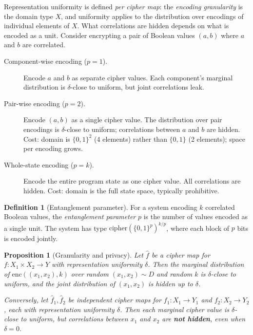 \documentclass[11pt]{article}
\theoremstyle{definition}
\newtheorem{definition}{Definition}[section]
\theoremstyle{plain}
\newtheorem{proposition}[theorem]{Proposition}
\theoremstyle{remark}
\newcommand{\fhat}{\hat{f}}
\newcommand{\enc}{\mathrm{enc}}
\begin{document}
Representation uniformity is defined \emph{per cipher map}: the
\emph{encoding granularity} is the domain type $X$, and uniformity applies
to the distribution over encodings of individual elements of $X$.  What
correlations are hidden depends on what is encoded as a unit.  Consider
encrypting a pair of Boolean values $(a, b)$ where $a$ and $b$ are
correlated.

\begin{description}
\item[Component-wise encoding ($p=1$).]
Encode $a$ and $b$ as separate cipher values.  Each component's marginal
distribution is $\delta$-close to uniform, but joint correlations leak.

\item[Pair-wise encoding ($p=2$).]
Encode $(a, b)$ as a single cipher value.  The distribution over pair
encodings is $\delta$-close to uniform; correlations between $a$ and $b$ are
hidden.  Cost: domain is $\{0,1\}^2$ (4 elements) rather than $\{0,1\}$
(2 elements); space per encoding grows.

\item[Whole-state encoding ($p=k$).]
Encode the entire program state as one cipher value.  All correlations are
hidden.  Cost: domain is the full state space, typically prohibitive.
\end{description}

\begin{definition}[Entanglement parameter]
For a system encoding $k$ correlated Boolean values, the \emph{entanglement
parameter} $p$ is the number of values encoded as a single unit.  The system
has type $\mathrm{cipher}(\{0,1\}^p)^{k/p}$, where each block of $p$ bits
is encoded jointly.
\end{definition}

\begin{proposition}[Granularity and privacy]
\label{prop:granularity}
Let $\fhat$ be a cipher map for $f : X_1 \times X_2 \to Y$ with
representation uniformity $\delta$.  Then the marginal distribution of
$\enc((x_1, x_2), k)$ over random $(x_1, x_2) \sim D$ and random $k$ is
$\delta$-close to uniform, and the joint distribution of $(x_1, x_2)$ is
hidden up to $\delta$.

Conversely, let $\fhat_1, \fhat_2$ be independent cipher maps for
$f_1 : X_1 \to Y_1$ and $f_2 : X_2 \to Y_2$, each with representation
uniformity $\delta$.  Then each marginal cipher value is $\delta$-close to
uniform, but correlations between $x_1$ and $x_2$ are \textbf{not hidden},
even when $\delta = 0$.
\end{proposition}
\end{document}
